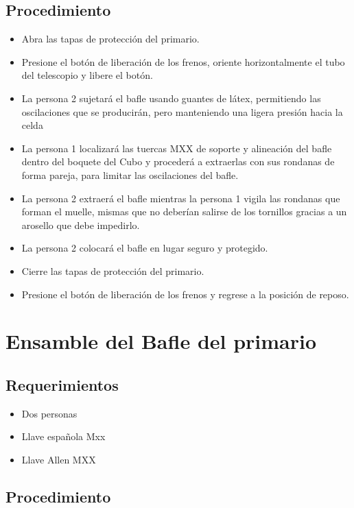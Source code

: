 \subsection{Procedimiento}

\begin{itemize}
\item Abra las tapas de protección del primario. 
\item Presione el botón de liberación de los frenos, oriente horizontalmente el tubo del telescopio y libere el botón. 
\item La persona 2 sujetará el bafle usando guantes de látex, permitiendo las oscilaciones que se producirán, pero manteniendo una ligera presión hacia la celda
\item La persona 1 localizará las tuercas MXX de soporte y alineación del bafle dentro del boquete del Cubo y procederá a extraerlas con sus rondanas de forma pareja, para limitar las oscilaciones del bafle.
\item La persona 2 extraerá el bafle mientras la persona 1 vigila las rondanas que forman el muelle, mismas que no deberían salirse de los tornillos gracias a un arosello que debe impedirlo.
\item La persona 2 colocará el bafle en lugar seguro y protegido.
\item Cierre las tapas de protección del primario.
\item Presione el botón de liberación de los frenos y regrese a la posición de reposo.
\end{itemize}

\section{Ensamble del Bafle del primario}

\subsection{Requerimientos}

\begin{itemize}
\item Dos personas
\item Llave española Mxx
\item Llave Allen MXX
\end{itemize}

\subsection{Procedimiento}

